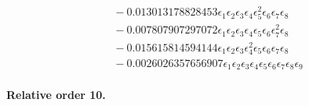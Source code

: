 \documentclass[10pt]{article}
\begin{document}
\begin{align*}
&{}  - 0.013013178828453 \epsilon_{1} \epsilon_{2} \epsilon_{3} \epsilon_{4} \epsilon_{5}^{2} \epsilon_{6} \epsilon_{7} \epsilon_{8} \\
&{}  - 0.007807907297072 \epsilon_{1} \epsilon_{2} \epsilon_{3} \epsilon_{4} \epsilon_{5} \epsilon_{6} \epsilon_{7}^{2} \epsilon_{8} \\
&{}  - 0.015615814594144 \epsilon_{1} \epsilon_{2} \epsilon_{3} \epsilon_{4}^{2} \epsilon_{5} \epsilon_{6} \epsilon_{7} \epsilon_{8} \\
&{}  - 0.0026026357656907 \epsilon_{1} \epsilon_{2} \epsilon_{3} \epsilon_{4} \epsilon_{5} \epsilon_{6} \epsilon_{7} \epsilon_{8} \epsilon_{9}
\end{align*}

\paragraph{Relative order 10.}
\end{document}
